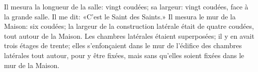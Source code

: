 Il mesura la longueur de la salle: vingt coudées;
	sa largeur: vingt coudées, face à la grande salle.
Il me dit: «C’est le Saint des Saints.»
Il mesura le mur de la Maison: six coudées;
	la largeur de la construction latérale était de quatre coudées,
		tout autour de la Maison.
Les chambres latérales étaient superposées; il y en avait trois étages de trente;
	elles s’enfonçaient dans le mur de l’édifice des chambres latérales tout autour,
		pour y être fixées,
	mais sans qu’elles soient fixées dans le mur de la Maison.
